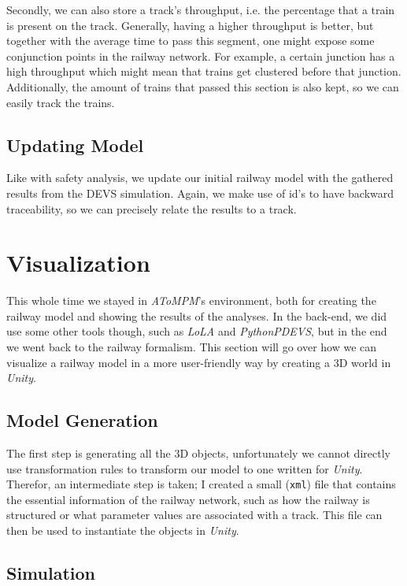 \documentclass{article}
\begin{document}
Secondly, we can also store a track's throughput, i.e. the percentage that a train is present on the track. Generally, having a higher throughput is better, but together with the average time to pass this segment, one might expose some conjunction points in the railway network. For example, a certain junction has a high throughput which might mean that trains get clustered before that junction. Additionally, the amount of trains that passed this section is also kept, so we can easily track the trains.

\subsection{Updating Model}

Like with safety analysis, we update our initial railway model with the gathered results from the DEVS simulation. Again, we make use of id's to have backward traceability, so we can precisely relate the results to a track.

\section{Visualization}

This whole time we stayed in \textit{AToMPM}'s environment, both for creating the railway model and showing the results of the analyses. In the back-end, we did use some other tools though, such as \textit{LoLA} and \textit{PythonPDEVS}, but in the end we went back to the railway formalism. This section will go over how we can visualize a railway model in a more user-friendly way by creating a 3D world in \textit{Unity}.

\subsection{Model Generation}

The first step is generating all the 3D objects, unfortunately we cannot directly use transformation rules to transform our model to one written for \textit{Unity}. Therefor, an intermediate step is taken; I created a small (\texttt{xml}) file that contains the essential information of the railway network, such as how the railway is structured or what parameter values are associated with a track. This file can then be used to instantiate the objects in \textit{Unity}.

\subsection{Simulation}
\end{document}
